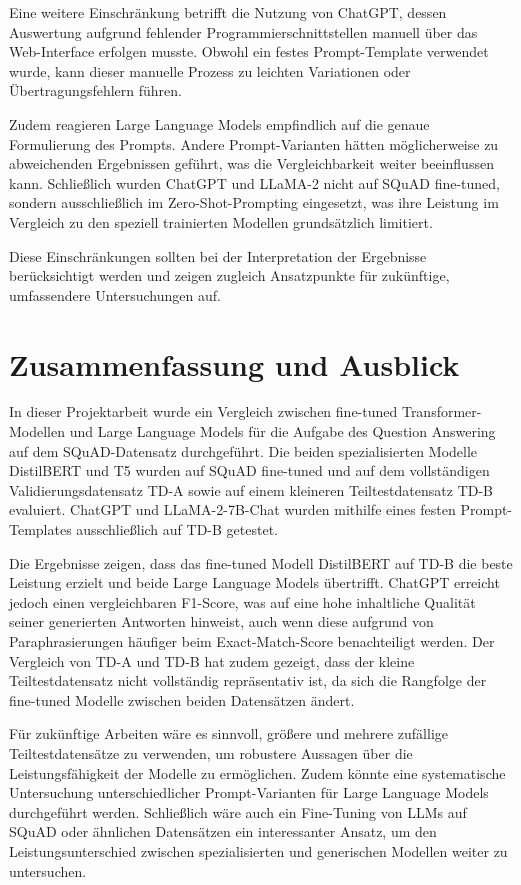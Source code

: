 \documentclass[12pt,oneside]{article}
\begin{document}
Eine weitere Einschränkung betrifft die Nutzung von ChatGPT, dessen
Auswertung aufgrund fehlender Programmierschnittstellen manuell über das
Web-Interface erfolgen musste. Obwohl ein festes Prompt-Template
verwendet wurde, kann dieser manuelle Prozess zu leichten Variationen
oder Übertragungsfehlern führen.

Zudem reagieren Large Language Models empfindlich auf die genaue
Formulierung des Prompts. Andere Prompt-Varianten hätten möglicherweise
zu abweichenden Ergebnissen geführt, was die Vergleichbarkeit weiter
beeinflussen kann. Schließlich wurden ChatGPT und LLaMA-2 nicht auf
SQuAD fine-tuned, sondern ausschließlich im Zero-Shot-Prompting
eingesetzt, was ihre Leistung im Vergleich zu den speziell trainierten
Modellen grundsätzlich limitiert.

Diese Einschränkungen sollten bei der Interpretation der Ergebnisse
berücksichtigt werden und zeigen zugleich Ansatzpunkte für zukünftige,
umfassendere Untersuchungen auf.
  
  \section{Zusammenfassung und Ausblick}

  In dieser Projektarbeit wurde ein Vergleich zwischen fine-tuned
Transformer-Modellen und Large Language Models für die Aufgabe des
Question Answering auf dem SQuAD-Datensatz durchgeführt. Die beiden
spezialisierten Modelle DistilBERT und T5 wurden auf SQuAD fine-tuned
und auf dem vollständigen Validierungsdatensatz TD-A sowie auf einem
kleineren Teiltestdatensatz TD-B evaluiert. ChatGPT und LLaMA-2-7B-Chat
wurden mithilfe eines festen Prompt-Templates ausschließlich auf TD-B
getestet.

Die Ergebnisse zeigen, dass das fine-tuned Modell DistilBERT auf TD-B
die beste Leistung erzielt und beide Large Language Models übertrifft.
ChatGPT erreicht jedoch einen vergleichbaren F1-Score, was auf eine hohe
inhaltliche Qualität seiner generierten Antworten hinweist, auch wenn
diese aufgrund von Paraphrasierungen häufiger beim Exact-Match-Score
benachteiligt werden. Der Vergleich von TD-A und TD-B hat zudem gezeigt,
dass der kleine Teiltestdatensatz nicht vollständig repräsentativ ist,
da sich die Rangfolge der fine-tuned Modelle zwischen beiden Datensätzen
ändert.

Für zukünftige Arbeiten wäre es sinnvoll, größere und mehrere zufällige
Teiltestdatensätze zu verwenden, um robustere Aussagen über die
Leistungsfähigkeit der Modelle zu ermöglichen. Zudem könnte eine
systematische Untersuchung unterschiedlicher Prompt-Varianten für Large
Language Models durchgeführt werden. Schließlich wäre auch ein
Fine-Tuning von LLMs auf SQuAD oder ähnlichen Datensätzen ein
interessanter Ansatz, um den Leistungsunterschied zwischen
spezialisierten und generischen Modellen weiter zu untersuchen.
  
   

  
  
  

\end{document}
